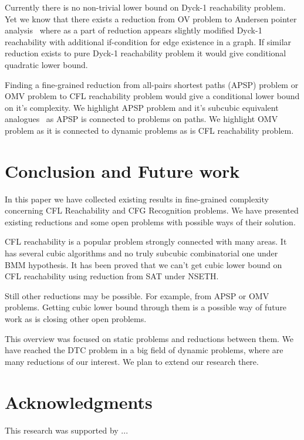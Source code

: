 \documentclass[acmsmall,review,nonacm]{acmart}\settopmatter{printfolios=true,printccs=false,printacmref=false}
\begin{document}
	 Currently there is no non-trivial lower bound on Dyck-1 reachability problem. 
	 Yet we know that there exists a reduction from OV problem to Andersen pointer analysis~\cite{10.1145/3434315} where as a part of reduction appears slightly modified Dyck-1 reachability with additional if-condition for edge existence in a graph. If similar reduction exists to pure Dyck-1 reachability problem it would give conditional quadratic lower bound. 
	 
	 Finding a fine-grained reduction from all-pairs shortest paths (APSP) problem or OMV problem to CFL reachability problem would give a conditional lower bound on it's complexity. We highlight APSP problem and it's subcubic equivalent analogues~\cite{10.1145/3186893} as APSP is connected to problems on paths. We highlight OMV problem as it is connected to dynamic problems as is CFL reachability problem. 
	
	\section{Conclusion and Future work}
	
	In this paper we have collected existing results in fine-grained complexity concerning CFL Reachability and CFG Recognition problems. We have presented existing reductions and some open problems with possible ways of their solution. 
	
	CFL reachability is a popular problem strongly connected with many areas. It has several cubic algorithms and no truly subcubic combinatorial one under BMM hypothesis. It has been proved that we can't get cubic lower bound on CFL reachability using reduction from SAT under NSETH. 
	
	Still other reductions may be possible. For example, from APSP or OMV problems. Getting cubic lower bound through them is a possible way of future work as is closing other open problems. 
	
	This overview was focused on static problems and reductions between them. We have reached the DTC problem in a big field of dynamic problems, where are many reductions of our interest. We plan to extend our research there. 
	
	\section{Acknowledgments}
	
	This research was supported by ...
	
	
	
	
	\appendix
	
\end{document}
